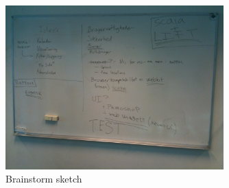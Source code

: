 \begin{figure}
\begin{center}
\leavevmode
\includegraphics[width=0.75\textwidth]{images/whiteboard6}
\end{center}
\caption{Brainstorm sketch}
\label{fig:app_w6}
\end{figure}